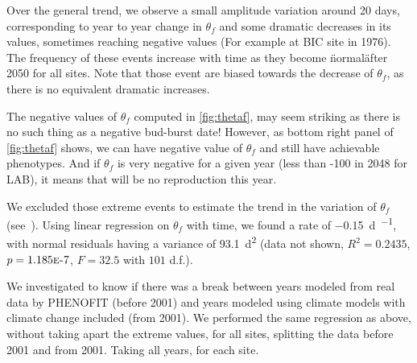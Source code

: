 Over the general trend, we observe a small amplitude variation around 20 days, corresponding to year to year change in $\theta_f$ and some dramatic decreases in its values, sometimes reaching negative values (For example at BIC site in 1976). The frequency of these events increase with time as they become \"normal\" after 2050 for all sites. Note that those event are biased towards the decrease of $\theta_f$, as there is no equivalent dramatic increases.

The negative values of $\theta_f$ computed in \autoref{fig:thetaf}, may seem striking as there is no such thing as a negative bud-burst date! However, as bottom right panel of \autoref{fig:thetaf} shows, we can have negative value of $\theta_f$ and still have achievable phenotypes. And if $\theta_f$ is very negative for a given year (less than -100 in 2048 for LAB), it means that will be no reproduction this year.

We excluded those extreme events to estimate the trend in the variation of $\theta_f$ (see~). Using linear regression on $\theta_f$ with time, we found a rate of \SI{-0.15}{\day\per\year}, with normal residuals having a variance of \SI{93.1}{\day\squared} (data not shown, $R^2=0.2435$, $p=1.185\text{\sc{e}-}7$, $F=32.5$ with $101$ d.f.).

We investigated to know if there was a break between years modeled from real data by \textsc{PHENOFIT} (before 2001) and years modeled using climate models with climate change included (from 2001). We performed the same regression as above, without taking apart the extreme values, for all sites, splitting the data before 2001 and from 2001. Taking all years, for each site.